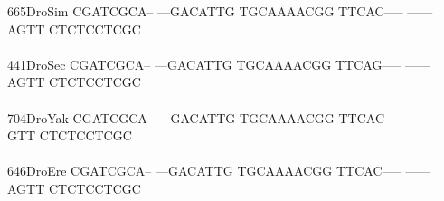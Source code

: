 \documentclass[11pt,twoside,reqno,a4paper]{article}
\begin{document}
{665\hspace*{2\charwidth}DroSim	CGATCGCA--	---GACATTG	TGCAAAACGG	TTCAC-----	------AGTT	CTCTCCTCGC	\\
\hspace*{5\charwidth}\hspace*{7\charwidth}\hspace*{1\charwidth}\hspace*{1\charwidth}\hspace*{1\charwidth}\hspace*{1\charwidth}\hspace*{1\charwidth}\hspace*{1\charwidth}\\
441\hspace*{2\charwidth}DroSec	CGATCGCA--	---GACATTG	TGCAAAACGG	TTCAG-----	------AGTT	CTCTCCTCGC	\\
\hspace*{5\charwidth}\hspace*{7\charwidth}\hspace*{1\charwidth}\hspace*{1\charwidth}\hspace*{1\charwidth}\hspace*{1\charwidth}\hspace*{1\charwidth}\hspace*{1\charwidth}\\
704\hspace*{2\charwidth}DroYak	CGATCGCA--	---GACATTG	TGCAAAACGG	TTCAC-----	-------GTT	CTCTCCTCGC	\\
\hspace*{5\charwidth}\hspace*{7\charwidth}\hspace*{1\charwidth}\hspace*{1\charwidth}\hspace*{1\charwidth}\hspace*{1\charwidth}\hspace*{1\charwidth}\hspace*{1\charwidth}\\
646\hspace*{2\charwidth}DroEre	CGATCGCA--	---GACATTG	TGCAAAACGG	TTCAC-----	------AGTT	CTCTCCTCGC	\\
\hspace*{5\charwidth}\hspace*{7\charwidth}\hspace*{1\charwidth}\hspace*{1\charwidth}\hspace*{1\charwidth}\hspace*{1\charwidth}\hspace*{1\charwidth}\hspace*{1\charwidth}\\
}
\end{document}
